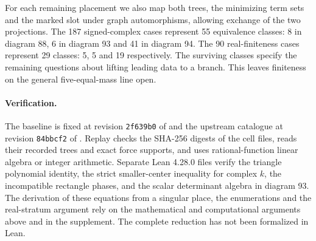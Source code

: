 \documentclass[11pt]{article}
\begin{document}
For each remaining placement we also map both trees, the minimizing term sets and the marked slot under graph automorphisms, allowing exchange of the two projections. The 187 signed-complex cases represent 55 equivalence classes: 8 in diagram 88, 6 in diagram 93 and 41 in diagram 94. The 90 real-finiteness cases represent 29 classes: 5, 5 and 19 respectively. The surviving classes specify the remaining questions about lifting leading data to a branch. This leaves finiteness on the general five-equal-mass line open.

\paragraph{Verification.}
The baseline is fixed at revision \texttt{2f639b0} of \cite{Prior} and the upstream catalogue at revision \texttt{84bbcf2} of \cite{Data}. Replay checks the SHA-256 digests of the cell files, reads their recorded trees and exact force supports, and uses rational-function linear algebra or integer arithmetic. Separate Lean 4.28.0 files verify the triangle polynomial identity, the strict smaller-center inequality for complex $k$, the incompatible rectangle phases, and the scalar determinant algebra in diagram 93. The derivation of these equations from a singular place, the enumerations and the real-stratum argument rely on the mathematical and computational arguments above and in the supplement. The complete reduction has not been formalized in Lean.
\end{document}
